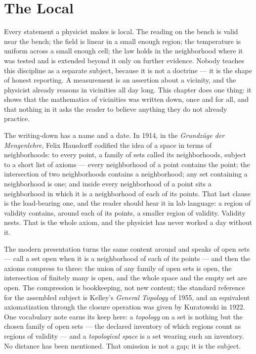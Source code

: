 \chapter{The Local}

Every statement a physicist makes is local. The reading on the bench is valid
near the bench; the field is linear in a small enough region; the temperature
is uniform across a small enough cell; the law holds in the neighborhood where
it was tested and is extended beyond it only on further evidence. Nobody
teaches this discipline as a separate subject, because it is not a doctrine ---
it is the shape of honest reporting. A measurement is an assertion about a
vicinity, and the physicist already reasons in vicinities all day long. This
chapter does one thing: it shows that the mathematics of vicinities was written
down, once and for all, and that nothing in it asks the reader to believe
anything they do not already practice.

The writing-down has a name and a date. In 1914, in the \emph{Grundz\"uge der
Mengenlehre}, Felix Hausdorff codified the idea of a space in terms of
neighborhoods: to every point, a family of sets called its neighborhoods,
subject to a short list of axioms --- every neighborhood of a point contains
the point; the intersection of two neighborhoods contains a neighborhood; any
set containing a neighborhood is one; and inside every neighborhood of a point
sits a neighborhood in which it is a neighborhood of each of its points. That
last clause is the load-bearing one, and the reader should hear it in lab
language: a region of validity contains, around each of its points, a smaller
region of validity. Validity nests. That is the whole axiom, and the physicist
has never worked a day without it.

The modern presentation turns the same content around and speaks of open sets
--- call a set open when it is a neighborhood of each of its points --- and
then the axioms compress to three: the union of any family of open sets is
open, the intersection of finitely many is open, and the whole space and the
empty set are open. The compression is bookkeeping, not new content; the
standard reference for the assembled subject is Kelley's \emph{General
Topology} of 1955, and an equivalent axiomatization through the closure
operation was given by Kuratowski in 1922. One vocabulary note earns its keep
here: a \emph{topology} on a set is nothing but the chosen family of open sets
--- the declared inventory of which regions count as regions of validity ---
and a \emph{topological space} is a set wearing such an inventory. No distance
has been mentioned. That omission is not a gap; it is the subject.

